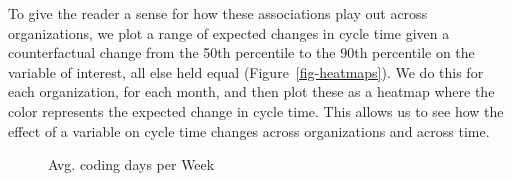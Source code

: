 \documentclass[manuscript,screen,review]{acmart}
\begin{document}
To give the reader a sense for how these associations play out across
organizations, we plot a range of expected changes in cycle time given a
counterfactual change from the 50th percentile to the 90th percentile on
the variable of interest, all else held equal
(Figure~\ref{fig-heatmaps}). We do this for each organization, for each
month, and then plot these as a heatmap where the color represents the
expected change in cycle time. This allows us to see how the effect of a
variable on cycle time changes across organizations and across time.

\begin{figure}

\begin{minipage}{0.33\linewidth}


\subcaption{\label{fig-heatmaps-coding}}

\end{minipage}%
%
\begin{minipage}{0.33\linewidth}
Avg. coding days per Week\end{minipage}%
%
\begin{minipage}{0.33\linewidth}

\centering{

}
\end{minipage}
\end{figure}
\end{document}
